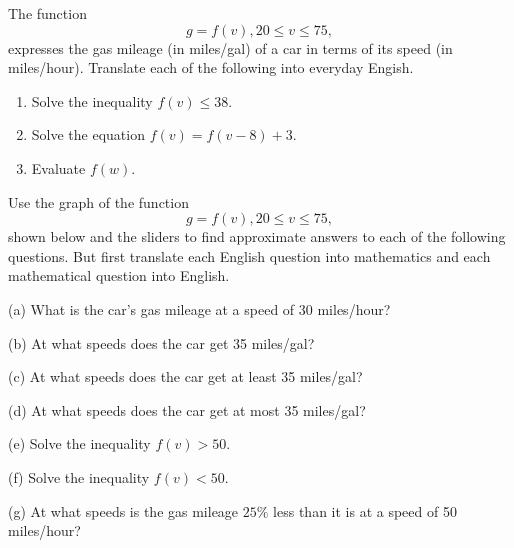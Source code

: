 \documentclass{ximera}
\begin{document}
\begin{example}  \label{ExFun25}

The function
\[
   g = f(v) , 20 \leq v \leq 75 ,
\]
expresses the gas mileage (in miles/gal) of a car in terms of its speed (in miles/hour). Translate each of the following into everyday Engish.

\begin{enumerate}

\item Solve the inequality $f(v)\leq 38$.




\item Solve the equation $f(v)=f(v-8) + 3$.

\item Evaluate $f(w)$.

\end{enumerate}

\end{example}


\begin{example}  \label{ExFun35}
Use the graph of the function 
\[
    g = f(v) , 20\leq v \leq 75 ,
\]
shown below and the sliders to find approximate answers to each of the following questions. But first translate each English question into mathematics and each mathematical question into English.

(a) What is the car's gas mileage at a speed of 30 miles/hour?

(b) At what speeds does the car get 35 miles/gal?

(c)  At what speeds does the car get at least 35 miles/gal?

(d)  At what speeds does the car get at most 35 miles/gal?

(e) Solve the inequality $f(v)> 50$.

(f) Solve the inequality $f(v)<50$.

(g) At what speeds is the gas mileage $25\%$ less than it is at a speed of 50 miles/hour?



\begin{exploration}\label{exp:Fun3}


 
\begin{onlineOnly}
    \begin{center}
\end{center}
\end{onlineOnly}
\end{exploration}



\end{example}
\end{document}
